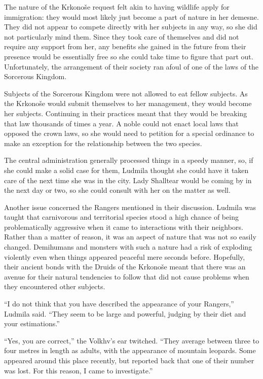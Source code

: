  

The nature of the Krkonoše request felt akin to having wildlife apply for immigration: they would most likely just become a part of nature in her demesne. They did not appear to compete directly with her subjects in any way, so she did not particularly mind them. Since they took care of themselves and did not require any support from her, any benefits she gained in the future from their presence would be essentially free so she could take time to figure that part out. Unfortunately, the arrangement of their society ran afoul of one of the laws of the Sorcerous Kingdom.

 

Subjects of the Sorcerous Kingdom were not allowed to eat fellow subjects. As the Krkonoše would submit themselves to her management, they would become her subjects. Continuing in their practices meant that they would be breaking that law thousands of times a year. A noble could not enact local laws that opposed the crown laws, so she would need to petition for a special ordinance to make an exception for the relationship between the two species.

 

The central administration generally processed things in a speedy manner, so, if she could make a solid case for them, Ludmila thought she could have it taken care of the next time she was in the city. Lady Shalltear would be coming by in the next day or two, so she could consult with her on the matter as well.

 

Another issue concerned the Rangers mentioned in their discussion. Ludmila was taught that carnivorous and territorial species stood a high chance of being problematically aggressive when it came to interactions with their neighbors. Rather than a matter of reason, it was an aspect of nature that was not so easily changed. Demihumans and monsters with such a nature had a risk of exploding violently even when things appeared peaceful mere seconds before. Hopefully, their ancient bonds with the Druids of the Krkonoše meant that there was an avenue for their natural tendencies to follow that did not cause problems when they encountered other subjects.

 

“I do not think that you have described the appearance of your Rangers,” Ludmila said. “They seem to be large and powerful, judging by their diet and your estimations.”

 

“Yes, you are correct,” the Volkhv’s ear twitched. “They average between three to four metres in length as adults, with the appearance of mountain leopards. Some appeared around this place recently, but reported back that one of their number was lost. For this reason, I came to investigate.”

 